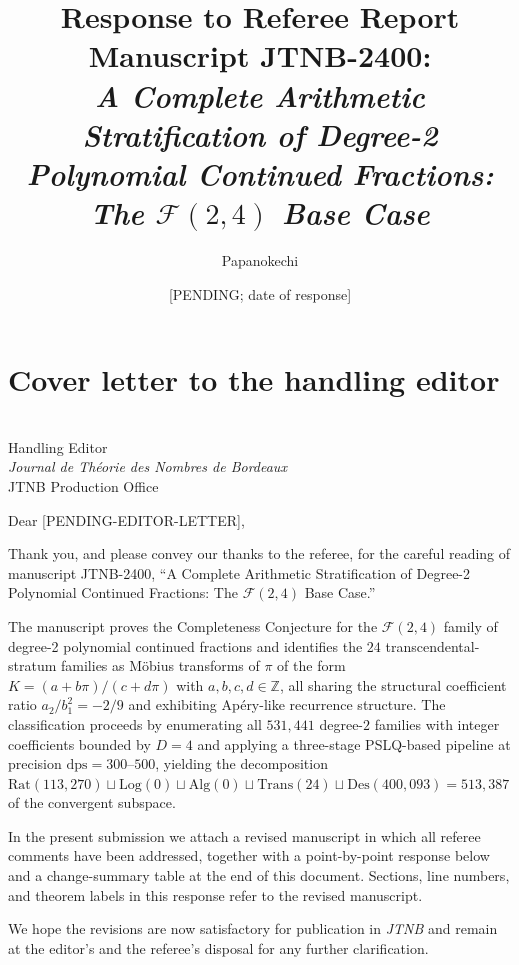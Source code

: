 \documentclass[11pt]{amsart}
\title[Response to Referee --- JTNB-2400]{Response to Referee Report\\
\textnormal{\small Manuscript JTNB-2400:\\
\emph{A Complete Arithmetic Stratification of Degree-2 Polynomial
Continued Fractions: The $\mathcal{F}(2,4)$ Base Case}}}
\author{Papanokechi}
\date{[PENDING; date of response]}
\begin{document}
\maketitle

\section*{Cover letter to the handling editor}

\\
Handling Editor\\
\emph{Journal de Th\'eorie des Nombres de Bordeaux}\\
JTNB Production Office

\bigskip

\noindent
Dear [PENDING-EDITOR-LETTER],

\medskip

Thank you, and please convey our thanks to the referee, for the
careful reading of manuscript JTNB-2400, ``A Complete Arithmetic
Stratification of Degree-2 Polynomial Continued Fractions: The
$\mathcal{F}(2,4)$ Base Case.''

The manuscript proves the Completeness Conjecture for the
$\mathcal{F}(2,4)$ family of degree-2 polynomial continued fractions
and identifies the $24$ transcendental-stratum families as
M\"obius transforms of $\pi$ of the form $K = (a + b\pi)/(c + d\pi)$
with $a,b,c,d\in\mathbb{Z}$, all sharing the structural coefficient
ratio $a_{2}/b_{1}^{2} = -2/9$ and exhibiting Ap\'ery-like recurrence
structure.  The classification proceeds by enumerating all $531{,}441$
degree-$2$ families with integer coefficients bounded by $D = 4$ and
applying a three-stage PSLQ-based pipeline at precision
$\mathrm{dps} = 300$--$500$, yielding the decomposition
\(
  \mathrm{Rat}(113{,}270)\sqcup\mathrm{Log}(0)\sqcup\mathrm{Alg}(0)
  \sqcup\mathrm{Trans}(24)\sqcup\mathrm{Des}(400{,}093)
  = 513{,}387
\)
of the convergent subspace.

In the present submission we attach a revised manuscript in which
all referee comments have been addressed, together with a
point-by-point response below and a change-summary table at the end
of this document.  Sections, line numbers, and theorem labels in this
response refer to the revised manuscript.

We hope the revisions are now satisfactory for publication in
\emph{JTNB} and remain at the editor's and the referee's disposal
for any further clarification.
\end{document}
